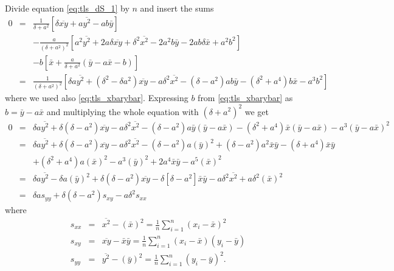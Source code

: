 \documentclass[a4paper,11pt,onepage]{article}
\begin{document}
Divide equation \eqref{eq:tls_dS_1} by $n$ and insert the sums
\begin{eqnarray*}
 0 &=&
  \frac1{\delta+a^2} \left [ \delta \overline{xy} + a \overline{y^2} - ab\bar y \right] \\
&&  - \frac{a}{(\delta+a^2)^2} \left[ a^2 \overline{ y^2}  + 2a\delta \overline{xy} + \delta^2\overline{x^2}  
-2 a^2b  \bar y  - 2 ab \delta \bar x + a^2 b^2  \right] \\
&&- b \left[  \bar x + \frac{a}{\delta+a^2} \left(  \bar y - a  \bar x - b\right) \right] \\	
&=& \frac1{(\delta+a^2)^2} \left[ \delta a \overline{y^2} + (\delta^2 - \delta a^2 )\overline{xy} -a \delta^2 \overline{x^2} -(\delta-a^2)ab \bar y - (\delta^2+a^4 )  b \bar x -a^3 b^2
\right]
\end{eqnarray*}
where we used also \eqref{eq:tls_xbarybar}. Expressing $b$ from \eqref{eq:tls_xbarybar} as $ b = \bar y - a \bar x$ and multiplying the whole equation with $(\delta+a^2)^2$ we get
\begin{eqnarray*}
 0 &=& \delta a \overline{y^2} + \delta(\delta -a^2 )\overline{xy} -a \delta^2 \overline{x^2} -(\delta-a^2)a \bar y ( \bar y - a \bar x) - (\delta^2+ a^4)  \bar x ( \bar y - a \bar x) -a^3 (\bar y - a \bar x)^2\\
 &=& \delta a \overline{y^2} + \delta (\delta -a^2 )\overline{xy} -a \delta^2 \overline{x^2} -(\delta-a^2)a \left(\bar y\right)^2  +(\delta-a^2) a^2 \bar x\bar y - (\delta+ a^4)  \bar x \bar y \\
 &&+ (\delta^2+ a^4)a \left(\bar x\right)^2 -a^3 (\bar y)^2 +2 a^4 \bar x \bar y - a^5 \left( \bar x \right)^2 \\
 &=& \delta a \overline{y^2} - \delta a \left(\bar y\right)^2+ \delta (\delta -a^2 )\overline{xy} - \delta \left[ \delta - a^2\right] \bar x\bar y -a \delta^2 \overline{x^2} +a \delta^2\left( \bar x \right)^2 \\
 &=& \delta a s_{yy} + \delta (\delta-a^2) s_{xy} -a \delta^2s_{xx}
\end{eqnarray*}
where
\begin{eqnarray*}
 s_{xx} &=& \overline{x^2} - \left(\bar x \right)^2 = \frac1n \sum_{i=1}^n \left( x_i - \bar x \right)^2 \\%
 s_{xy} &=& \overline{xy} - \bar x \bar y  = \frac1n \sum_{i=1}^n \left( x_i - \bar x \right) \left( y_i - \bar y \right) \\
 s_{yy} &=& \overline{y^2} - \left(\bar y \right)^2 = \frac1n \sum_{i=1}^n \left( y_i - \bar y \right)^2.
 \end{eqnarray*}
\end{document}
